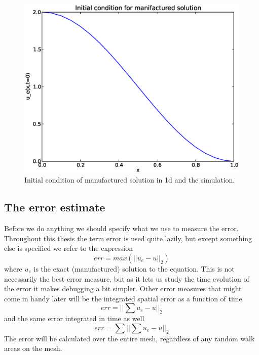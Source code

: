 \begin{figure}[H]
 \centering
 \includegraphics[scale=0.7]{../doc/results/experiment_31102013_1017/results/initial_condition.eps}
 \caption[Initial condition in 1d]{Initial condition of manufactured solution in 1d and the simulation.}
 \label{initial_condition_1d}
\end{figure}

\subsection{The error estimate}
Before we do anything we should specify what we use to measure the error. 
Throughout this thesis the term error is used quite lazily, but except something else is specified we refer to the expression 
\begin{equation}
 err = max\left(||u_e-u||_2\right)
\end{equation}
where $u_e$ is the exact (manufactured) solution to the equation. 
This is not necessarily the best error measure, but as it lets us study the time evolution of the error it makes debugging a bit simpler. 
Other error measures that might come in handy later will be the integrated spatial error as a function of time
\begin{equation}
 err = ||\sum u_e-u||_2
\end{equation}
and the same error integrated in time as well
\begin{equation}
 err = \sum||\sum u_e-u||_2
\end{equation}
The error will be calculated over the entire mesh, regardless of any random walk areas on the mesh.

